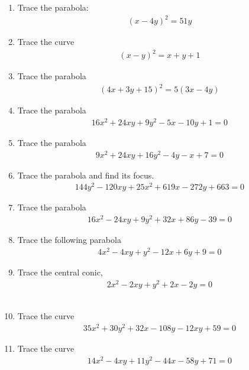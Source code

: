 \renewcommand{\theequation}{\theenumi}
\renewcommand{\thefigure}{\theenumi}
\begin{enumerate}[label=\thesubsection.\arabic*.,ref=\thesubsection.\theenumi]
%
\item Trace the parabola:
\begin{align}
	(x-4y)^2=51y
\end{align}
%
\solution


%
\item 	Trace the curve 
	\begin{align}
	\left(x-y\right)^2 = x+y+1
	\label{eq:solutions/41/2/eq0}
	\end{align}
%
\solution

%
\item Trace the parabola
\begin{align}
    (4x+3y+15)^2=5(3x-4y)
\end{align}
%
\solution

%
\item Trace the parabola
\begin{align}\nonumber
    16x^2+24xy+9y^2-5x-10y+1 = 0
\end{align}
%
\solution

%
\item Trace the parabola
\begin{align}
  9x^2+24xy+16y^2-4y-x+7=0 \label{eq:solutions/41/6/eq:prob}
\end{align}
%
\solution

%
\item Trace the parabola and find its focus.
\begin{align}
144y^2-120xy+25x^2+619x-272y+663=0
\end{align}
%
%
\solution

\item Trace the parabola
\begin{align}
   16x^2-24xy+9y^2+32x+86y-39=0 \label{eq:solutions/41/8/eq:given}
\end{align}
%
\solution

\item Trace the following parabola
\begin{align}
    4x^2-4xy+y^2-12x+6y+9=0
\end{align}
%
%
\solution

%
\item Trace the central conic,
\begin{align}
2x^2 - 2xy + y^2 + 2x - 2y = 0\label{eq:solutions/41/17/eq:1}
\end{align}
%
\\
\solution

\item Trace the curve
\begin{align}
35x^2+30y^2+32x-108y-12xy+59=0 \label{eq:solutions/41/ex/given_curve_eq}
\end{align}
%
\solution

\item Trace the curve
\begin{align}
14x^2 - 4xy + 11y^2 - 44x - 58y + 71 =0  \label{eq:solutions/41/ex1/given_curve_eq}
\end{align}


\end{enumerate}
